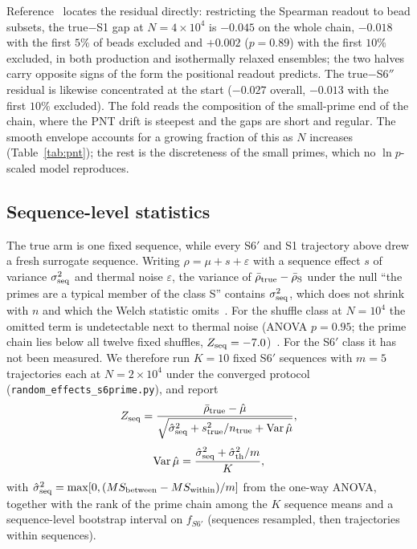 \documentclass[reprint,amsmath,amssymb,aps,pre,longbibliography]{revtex4-2}
\begin{document}
Reference~\cite{PDTP4} locates the residual directly: restricting the Spearman readout to
bead subsets, the true$-$S1 gap at $N=4\times10^{4}$ is $-0.045$ on the whole chain, $-0.018$
with the first $5\%$ of beads excluded and $+0.002$ ($p=0.89$) with the first $10\%$ excluded,
in both production and isothermally relaxed ensembles; the two halves carry opposite signs
of the form the positional readout predicts. The true$-$S6$''$ residual is likewise
concentrated at the start ($-0.027$ overall, $-0.013$ with the first $10\%$ excluded). The
fold reads the composition of the small-prime end of the chain, where the PNT drift is
steepest and the gaps are short and regular. The smooth envelope accounts for a growing
fraction of this as $N$ increases (Table~\ref{tab:pnt}); the rest is the discreteness of the
small primes, which no $\ln p$-scaled model reproduces.

\subsection{Sequence-level statistics}\label{sec:re}

The true arm is one fixed sequence, while every S6$'$ and S1 trajectory above drew a fresh
surrogate sequence. Writing $\rho=\mu+s+\varepsilon$ with a sequence effect $s$ of variance
$\sigma^{2}_{\rm seq}$ and thermal noise $\varepsilon$, the variance of
$\bar\rho_{\rm true}-\bar\rho_{\rm S}$ under the null ``the primes are a typical member of
the class S'' contains $\sigma^{2}_{\rm seq}$, which does not shrink with $n$ and which the
Welch statistic omits~\cite{PDTP4}. For the shuffle class at $N=10^{4}$ the omitted term is
undetectable next to thermal noise (ANOVA $p=0.95$; the prime chain lies below all twelve
fixed shuffles, $Z_{\rm seq}=-7.0$)~\cite{PDTP4}. For the S6$'$ class it has not been
measured. We therefore run $K=10$ fixed S6$'$ sequences with $m=5$ trajectories each at
$N=2\times10^{4}$ under the converged protocol (\texttt{random\_effects\_s6prime.py}), and
report
\begin{equation}
Z_{\rm seq}=\frac{\bar\rho_{\rm true}-\hat\mu}{\sqrt{\hat\sigma^{2}_{\rm seq}+s^{2}_{\rm true}/n_{\rm true}+{\rm Var}\,\hat\mu}},
\label{eq:zseq}
\end{equation}
\begin{equation}
{\rm Var}\,\hat\mu=\frac{\hat\sigma^{2}_{\rm seq}+\hat\sigma^{2}_{\rm th}/m}{K},
\end{equation}
with $\hat\sigma^{2}_{\rm seq}=\max[0,(MS_{\rm between}-MS_{\rm within})/m]$ from the
one-way ANOVA, together with the rank of the prime chain among the $K$ sequence means and a
sequence-level bootstrap interval on $f_{S6'}$ (sequences resampled, then trajectories
within sequences).
\end{document}
